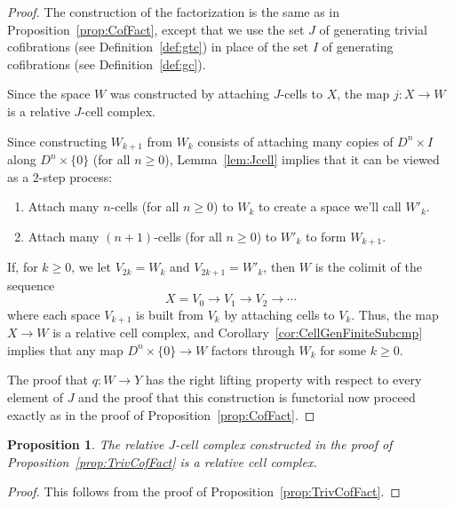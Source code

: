 \documentclass{amsart}
\numberwithin{equation}{section}
\theoremstyle{slplain}
\newtheorem{prop}[equation]{Proposition}
\theoremstyle{definition}
\theoremstyle{remark}
\newcommand{\propref}{Proposition~\ref}
\newcommand{\lemref}{Lemma~\ref}
\newcommand{\defref}{Definition~\ref}
\begin{document}
\begin{proof}
  The construction of the factorization is the same as in
  \propref{prop:CofFact}, except that we use the set $J$ of generating
  trivial cofibrations (see \defref{def:gtc}) in place of the set $I$
  of generating cofibrations (see \defref{def:gc}).

  Since the space $W$ was constructed by attaching $J$-cells to $X$,
  the map $j\colon X \to W$ is a relative $J$-cell complex.

  Since constructing $W_{k+1}$ from $W_{k}$ consists of attaching many
  copies of $D^{n}\times I$ along $D^{n}\times\{0\}$ (for all $n \ge
  0$), \lemref{lem:Jcell} implies that it can be viewed as a 2-step
  process:
  \begin{enumerate}
  \item Attach many $n$-cells (for all $n \ge 0$) to $W_{k}$ to create
    a space we'll call $W'_{k}$.
  \item Attach many $(n+1)$-cells (for all $n \ge 0$) to $W'_{k}$ to
    form $W_{k+1}$.
  \end{enumerate}
  If, for $k \ge 0$, we let $V_{2k} = W_{k}$ and $V_{2k+1} = W'_{k}$,
  then $W$ is the colimit of the sequence
  \begin{displaymath}
    X = V_{0} \to V_{1} \to V_{2} \to \cdots
  \end{displaymath}
  where each space $V_{k+1}$ is built from $V_{k}$ by attaching cells
  to $V_{k}$.  Thus, the map $X \to W$ is a relative cell complex, and
  Corollary~\ref{cor:CellGenFiniteSubcmp} implies that any map
  $D^{n}\times\{0\} \to W$ factors through $W_{k}$ for some $k \ge
  0$.

  The proof that $q\colon W \to Y$ has the right lifting property with
  respect to every element of $J$ and the proof that this construction
  is functorial now proceed exactly as in the proof of
  \propref{prop:CofFact}.
\end{proof}


\begin{prop}
  \label{prop:JclClCmp}
  The relative $J$-cell complex constructed in the proof of
  \propref{prop:TrivCofFact} is a relative cell complex.
\end{prop}

\begin{proof}
  This follows from the proof of \propref{prop:TrivCofFact}.
\end{proof}


\end{document}
